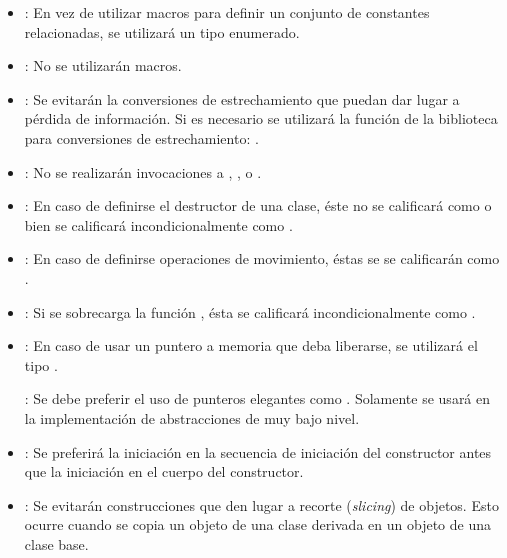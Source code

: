 \begin{itemize}
\item {}:
En vez de utilizar macros para definir un conjunto de constantes relacionadas,
se utilizará un tipo enumerado.

\item {}:
No se utilizarán macros.

\item {}:
Se evitarán la conversiones de estrechamiento que puedan dar lugar a pérdida
de información. Si es necesario se utilizará la función de la biblioteca
 para conversiones de estrechamiento:
.

\item {}:
No se realizarán invocaciones a
, ,  o .

\item {}:
En caso de definirse el destructor de una clase,
éste no se calificará como  o bien
se calificará incondicionalmente como .

\item {}:
En caso de definirse operaciones de movimiento, éstas se se calificarán como
.

\item {}:
Si se sobrecarga la función ,
ésta se calificará incondicionalmente como .

\item {}:
En caso de usar un puntero a memoria que deba liberarse, se utilizará
el tipo .

: Se debe preferir el uso de punteros elegantes como
. Solamente se usará  en la
implementación de abstracciones de muy bajo nivel.

\item {}:
Se preferirá la iniciación en la secuencia de iniciación del constructor
antes que la iniciación en el cuerpo del constructor.

\item {}:
Se evitarán construcciones que den lugar a recorte (\emph{slicing}) de objetos.
Esto ocurre cuando se copia un objeto de una clase derivada en un objeto de una
clase base.


\end{itemize}
